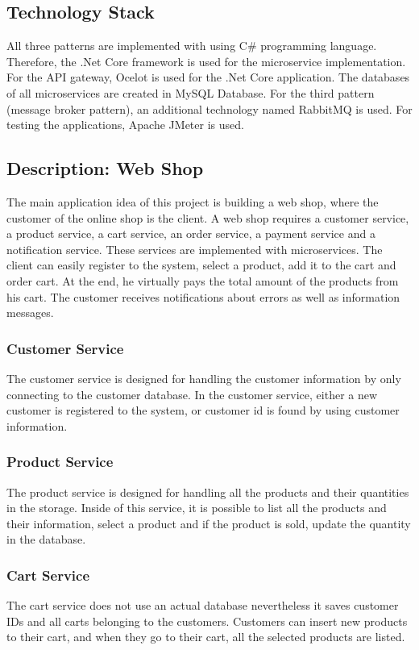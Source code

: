 \documentclass{article}
\begin{document}
\subsection{Technology Stack}
All three patterns are implemented with using C\# programming language. Therefore, the .Net Core framework is used for the microservice implementation. For the API gateway, Ocelot is used for the .Net Core application. The databases of all microservices are created in MySQL Database. For the third pattern (message broker pattern), an additional technology named RabbitMQ is used. For testing the applications, Apache JMeter is used. 

\subsection{Description: Web Shop}
The main application idea of this project is building a web shop, where the customer of the online shop is the client. A web shop requires a customer service, a product service, a cart service, an order service, a payment service and a notification service. These services are implemented with microservices. The client can easily register to the system, select a product, add it to the cart and order cart. At the end, he virtually pays the total amount of the products from his cart. The customer receives notifications about errors as well as information messages.  

\subsubsection{Customer Service}
The customer service is designed for handling the customer information by only connecting to the customer database. In the customer service, either a new customer is registered to the system, or customer id  is found by using customer information.

\subsubsection{Product Service}
The product service is designed for handling all the products and their quantities in the storage. Inside of this service, it is possible to list all the products and their information, select a product and if the product is sold, update the quantity in the database. 

\subsubsection{Cart Service}
The cart service does not use an actual database nevertheless it saves customer IDs and all carts belonging to the customers. Customers can insert new products to their cart, and when they go to their cart, all the selected products are listed. 
\end{document}
